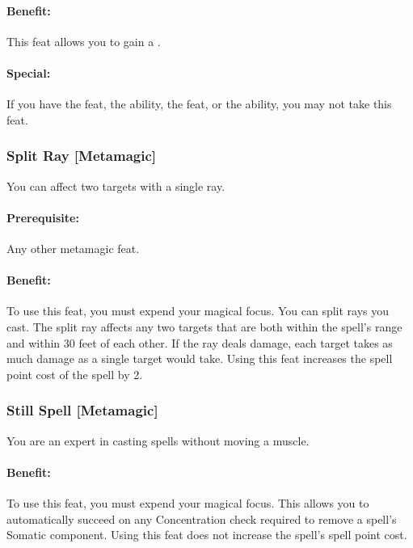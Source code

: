 \paragraph{Benefit:} This feat allows you to gain a . 

\paragraph{Special:} If you have the  feat, the  ability, the  feat, or the  ability, you may not take this feat.
\subsubsection[Split Ray]{Split Ray [Metamagic]}
\label{Feat:SplitRay}
You can affect two targets with a single ray.

\paragraph{Prerequisite:} Any other metamagic feat.

\paragraph{Benefit:} To use this feat, you must expend your magical focus. You can split rays you cast. 
The split ray affects any two targets that are both within the spell's range and within 30 feet of each other. 
If the ray deals damage, each target takes as much damage as a single target would take.
Using this feat increases the spell point cost of the spell by 2.

\subsubsection[Still Spell]{Still Spell [Metamagic]}
\label{Feat:StillSpell}
You are an expert in casting spells without moving a muscle.

\paragraph{Benefit:} To use this feat, you must expend your magical focus.
This allows you to automatically succeed on any Concentration check required to remove a spell's Somatic component.
Using this feat does not increase the spell's spell point cost.

